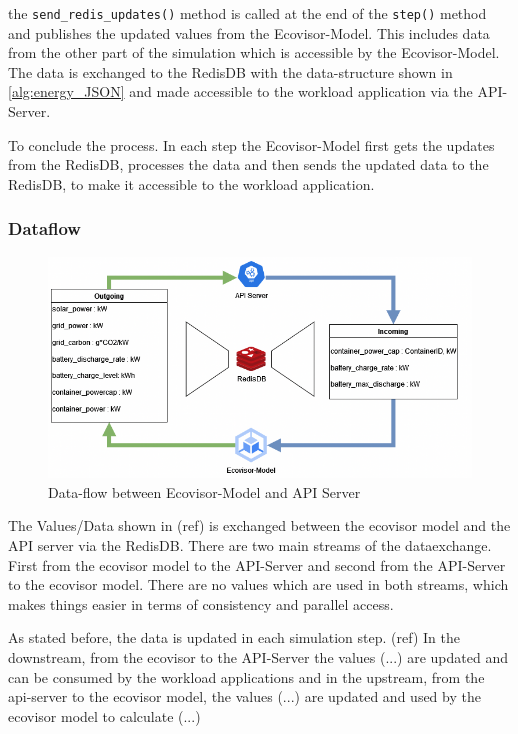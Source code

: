 the \texttt{send\_redis\_updates()} method is called at the end of the \texttt{step()} method and  publishes the updated values from the Ecovisor-Model. This includes data from the other part of the simulation which is accessible by the Ecovisor-Model.
The data is exchanged to the RedisDB with the data-structure shown in \ref{alg:energy_JSON} and made accessible to the workload application via the API-Server. 

To conclude the process. In each step the Ecovisor-Model first gets the updates from the RedisDB, processes the data and then sends the updated data to the RedisDB, to make it
accessible to the workload application.


\subsubsection{Dataflow}
\label{subsec:dataflow}
\begin{figure}
    \centering
    \includegraphics[width=\linewidth]{figures/Dataflow.drawio.png}
    \caption{Data-flow between Ecovisor-Model and API Server}
    \label{fig:dataflow}
\end{figure}

The Values/Data shown in (ref) is exchanged between the ecovisor model and the API server via the RedisDB. There are two main streams of the dataexchange.
First from the ecovisor model to the API-Server and second from the API-Server to the ecovisor model. There are no values which are used in both streams, which makes things
easier in terms of consistency and parallel access.

As stated before, the data is updated in each simulation step. (ref)
In the downstream, from the ecovisor to the API-Server the values (...) are updated and can be consumed by the workload applications
and in the upstream, from the api-server to the ecovisor model, the values (...) are updated and used by the ecovisor model to calculate (...) %

